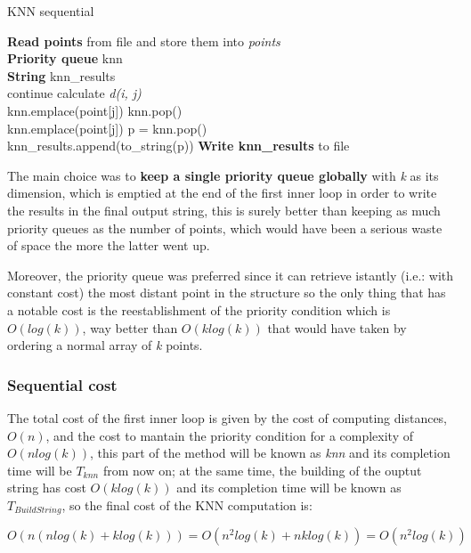 \begin{algorithm}[H]
    \caption{KNN sequential}
    \label{algorithm:knn}
    \textbf{Read points} from file and store them into \textit{points}\\
    \textbf{Priority queue} knn\\
    \textbf{String} knn\_results\\
     {
         {
             {
                continue
            }
            calculate \textit{d(i, j)}\\
             {
                knn.emplace(point[j])
            } {
                knn.pop()\\
                knn.emplace(point[j])
            }
        }
         {
            p = knn.pop()\\
            knn\_results.append(to\_string(p))
        }
    }
    \textbf{Write knn\_results} to file
\end{algorithm}
The main choice was to \textbf{keep a single priority queue globally} with \textit{k} as its dimension, which is emptied at the end of the first inner loop in order to write the results in the final output string, this is surely better than keeping as much priority queues as the number of points, which would have been a serious waste of space the more the latter went up.
\vspace{3mm}

Moreover, the priority queue was preferred since it can retrieve istantly (i.e.: with constant cost) the most distant point in the structure so the only thing that has a notable cost is the reestablishment of the priority condition which is $O(log(k))$, way better than $O(klog(k))$ that would have taken by ordering a normal array of \textit{k} points.
\vspace{3mm}

\subsubsection{Sequential cost}
The total cost of the first inner loop is given by the cost of computing distances, $O(n)$, and the cost to mantain the priority condition for a complexity of $O(nlog(k))$, this part of the method will be known as \textit{knn} and its completion time will be $T_{knn}$ from now on; at the same time, the building of the ouptut string has cost $O(klog(k))$ and its completion time will be known as $T_{BuildString}$, so the final cost of the KNN computation is:
\begin{center}
\begin{Large}
$O(n(nlog(k)+klog(k)))=O(n^2log(k)+nklog(k))=O(n^2log(k))$
\end{Large}
\end{center}

